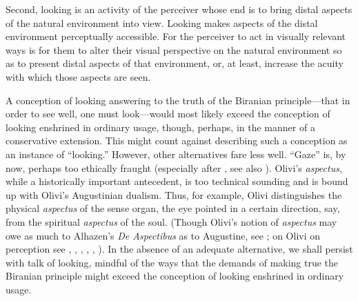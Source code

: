 Second, looking is an activity of the perceiver whose end is to bring distal aspects of the natural environment into view. Looking makes aspects of the distal environment perceptually accessible. For the perceiver to act in visually relevant ways is for them to alter their visual perspective on the natural environment so as to present distal aspects of that environment, or, at least, increase the acuity with which those aspects are seen. 

A conception of looking answering to the truth of the Biranian principle---that in order to see well, one must look---would most likely exceed the conception of looking enshrined in ordinary usage, though, perhaps, in the manner of a conservative extension. This might count against describing such a conception as an instance of ``looking.'' However, other alternatives fare less well. ``Gaze'' is, by now, perhaps too ethically fraught (especially after \citealt{Mulvey:1975aa}, see also \citealt{Jay:1994aa}). Olivi's \emph{aspectus}, while a historically important antecedent, is too technical sounding and is bound up with Olivi's Augustinian dualism. Thus, for example, Olivi distinguishes the physical \emph{aspectus} of the sense organ, the eye pointed in a certain direction, say, from the spiritual \emph{aspectus} of the soul. (Though Olivi's notion of \emph{aspectus} may owe as much to Alhazen's \emph{De Aspectibus} as to Augustine, see \citealt[41 especially n. 43]{Tachau:1988aa}; on Olivi on perception see \citealt[3--26, 39--54]{Tachau:1988aa}, \citealt[215--224]{Spruit:1994qq}, \citealt[121--124, 130--134, 168--181]{Pasnau:1997aa}, \citealt[part 1]{Toivanen:2009zf}, \citealt{Silva:2010zh}, \citealt[part 2]{Toivanen:2013ul}). In the absence of an adequate alternative, we shall persist with talk of looking, mindful of the ways that the demands of making true the Biranian principle might exceed the conception of looking enshrined in ordinary usage.

